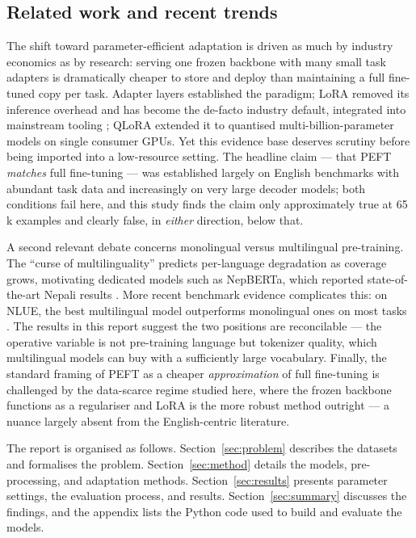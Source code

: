 \documentclass[11pt,a4paper]{article}
\begin{document}
\subsection{Related work and recent trends}
\label{sec:trends}

The shift toward parameter-efficient adaptation is driven as much by
industry economics as by research: serving one frozen backbone with many
small task adapters is dramatically cheaper to store and deploy than
maintaining a full fine-tuned copy per task. Adapter layers
\citep{houlsby2019adapters} established the paradigm; LoRA
\citep{hu2022lora} removed its inference overhead and has become the
de-facto industry default, integrated into mainstream tooling
\citep{mangrulkar2022peft}; QLoRA \citep{dettmers2023qlora} extended it
to quantised multi-billion-parameter models on single consumer GPUs.
Yet this evidence base deserves scrutiny before being imported into a
low-resource setting. The headline claim --- that PEFT \emph{matches}
full fine-tuning --- was established largely on English benchmarks with
abundant task data and increasingly on very large decoder models; both
conditions fail here, and this study finds the claim only approximately
true at 65\,k examples and clearly false, in \emph{either} direction,
below that.

A second relevant debate concerns monolingual versus multilingual
pre-training. The ``curse of multilinguality'' \citep{conneau2020xlmr}
predicts per-language degradation as coverage grows, motivating dedicated
models such as NepBERTa, which reported state-of-the-art Nepali results
\citep{timilsina2022nepberta}. More recent benchmark evidence complicates
this: on NLUE, the best multilingual model outperforms monolingual ones
on most tasks \citep{nyachhyon2025nlue}. The results in this report
suggest the two positions are reconcilable --- the operative variable is
not pre-training language but tokenizer quality, which multilingual
models can buy with a sufficiently large vocabulary. Finally, the
standard framing of PEFT as a cheaper \emph{approximation} of full
fine-tuning is challenged by the data-scarce regime studied here, where
the frozen backbone functions as a regulariser and LoRA is the more
robust method outright --- a nuance largely absent from the
English-centric literature.

The report is organised as follows. Section~\ref{sec:problem} describes
the datasets and formalises the problem. Section~\ref{sec:method} details
the models, pre-processing, and adaptation methods.
Section~\ref{sec:results} presents parameter settings, the evaluation
process, and results. Section~\ref{sec:summary} discusses the findings,
and the appendix lists the Python code used to build and evaluate the
models.
\end{document}
